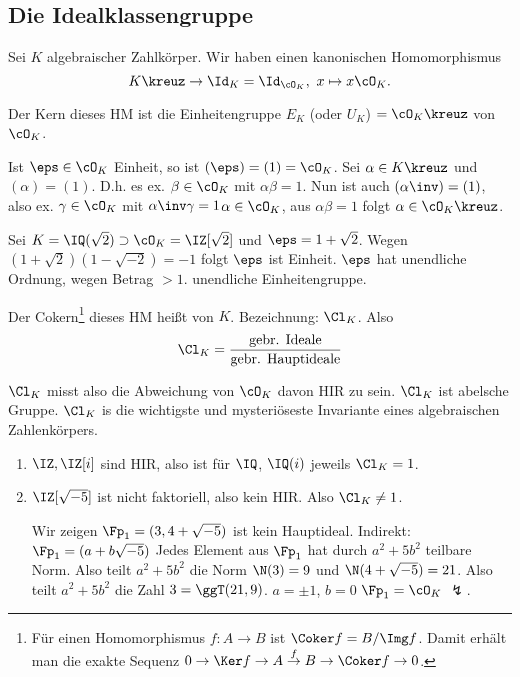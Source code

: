 \subsection{Die Idealklassengruppe}

Sei $K$ algebraischer Zahlkörper. Wir haben einen kanonischen Homomorphismus
\[ K\kreuz \rightarrow \Id_{K}=\Id_{\cO_K},\,\, x\mapsto x\cO_K.\]

\begin{Fakt}
 Der Kern dieses HM ist die Einheitengruppe $E_K$ (oder $U_K$) $=\cO_K\kreuz$ von $\cO_K$.
\end{Fakt}

\begin{Beweis}
 Ist $\eps\in \cO_K$ Einheit, so ist $(\eps)=(1)=\cO_K$. Sei $\alpha\in K\kreuz$ und $(\alpha)=(1)$. D.h. es ex. $\beta\in \cO_K$ mit $\alpha\beta=1$. Nun ist auch $(\alpha\inv)=(1)$, also ex. $\gamma\in \cO_K$ mit $\alpha\inv\gamma=1$\folge $\alpha\in \cO_K$, aus $\alpha\beta=1$ folgt $\alpha\in \cO_K\kreuz$. 
\end{Beweis}

\begin{Beispiel}
 Sei $K=\IQ(\sqrt 2)\supset \cO_K=\IZ[\sqrt 2]$ und $\eps=1+\sqrt 2$. Wegen $(1+\sqrt{2})(1-\sqrt{-2})=-1$ folgt $\eps$ ist Einheit. $\eps$ hat unendliche Ordnung, wegen Betrag $>1$. \folge unendliche Einheitengruppe.
\end{Beispiel}


\begin{Definition}
 Der Cokern\footnote{Für einen Homomorphismus $f:A\rightarrow B$ ist $\Coker f=B/\Img f$. Damit erhält man die exakte Sequenz $0\rightarrow\Ker f\rightarrow A\overset{f}{\rightarrow} B\rightarrow\Coker f\rightarrow 0$.} dieses HM heißt  von $K$. Bezeichnung: $\Cl_K$. Also \[\Cl_K=\frac{\text{gebr. Ideale}}{\text{gebr. Hauptideale}} \]
\end{Definition}

\begin{Bemerkung}
 $\Cl_K$ misst also die Abweichung von $\cO_K$ davon HIR zu sein. $\Cl_K$ ist abelsche Gruppe. $\Cl_K$ is die wichtigste und mysteriöseste Invariante eines algebraischen Zahlenkörpers.
\end{Bemerkung}


\begin{Beispiel}
 \begin{enumerate}
  \item $\IZ,\IZ[i]$ sind HIR, also ist für $\IQ$, $\IQ(i)$ jeweils $\Cl_K=1$.
  \item $\IZ[\sqrt{-5}]$ ist nicht faktoriell, also kein HIR. Also $\Cl_K\neq 1$.
  
  Wir zeigen $\Fp_1=(3,4+\sqrt{-5})$ ist kein Hauptideal. Indirekt: $\Fp_1=(a+b\sqrt{-5})$ \folge Jedes Element aus $\Fp_1$ hat durch $a^2+5b^2$ teilbare Norm. Also teilt $a^2+5b^2$ die Norm $\N(3)=9$ und $\N(4+\sqrt{-5})=21$. Also teilt $a^2+5b^2$ die Zahl $3=\ggT(21,9)$. \folge $a=\pm 1$, $b=0$ \folge $\Fp_1=\cO_K$ $\lightning$.
 \end{enumerate}
\end{Beispiel}
 

